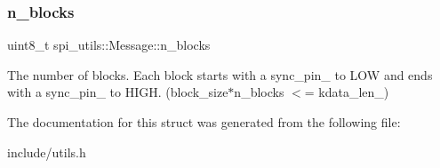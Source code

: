 \subsubsection{\texorpdfstring{n\+\_\+blocks}{n\_blocks}}
{\footnotesize\ttfamily uint8\+\_\+t spi\+\_\+utils\+::\+Message\+::n\+\_\+blocks}

The number of blocks. Each block starts with a sync\+\_\+pin\+\_\+ to L\+OW and ends with a sync\+\_\+pin\+\_\+ to H\+I\+GH. (block\+\_\+size$\ast$n\+\_\+blocks $<$= kdata\+\_\+len\+\_\+) 

The documentation for this struct was generated from the following file\+:\begin{DoxyCompactItemize}
\item 
include/utils.\+h\end{DoxyCompactItemize}
